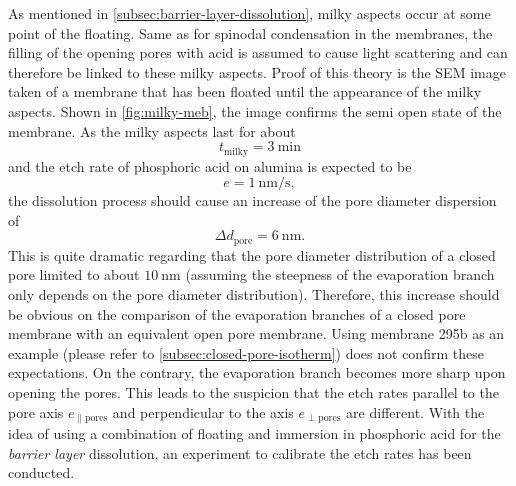 \documentclass[../thesis.tex]{subfiles}
\begin{document}
        As mentioned in \cref{subsec:barrier-layer-dissolution}, milky aspects occur at some point of the floating. Same as for spinodal condensation in the membranes, the filling of the opening pores with acid is assumed to cause light scattering and can therefore be linked to these milky aspects. Proof of this theory is the SEM image taken of a membrane that has been floated until the appearance of the milky aspects. Shown in \cref{fig:milky-meb}, the image confirms the semi open state of the membrane. As the milky aspects last for about
        \begin{equation*}
          t_\mathrm{milky} =\SI{3}{\minute}
        \end{equation*}
        and the etch rate of phosphoric acid on alumina is expected to be
        \begin{equation*}
          e=\SI{1}{\nano\meter\per\second},
        \end{equation*}
        the  dissolution process should cause an increase of the pore diameter dispersion of
        \begin{equation*}
          \Delta d_\mathrm{pore} = \SI{6}{\nano\meter}.
        \end{equation*}
        This is quite dramatic regarding that the pore diameter distribution of a closed pore limited to about $\SI{10}{\nano\meter}$ (assuming the steepness of the evaporation branch only depends on the pore diameter distribution). Therefore, this increase should be obvious on the comparison of the evaporation branches of a closed pore membrane with an equivalent open pore membrane. Using membrane 295b as an example (please refer to \cref{subsec:closed-pore-isotherm}) does not confirm these expectations. On the contrary, the evaporation branch becomes more sharp upon opening the pores. This leads to the suspicion that the etch rates parallel to the pore axis $e_\mathrm{\parallel pores}$ and perpendicular to the axis $e_\mathrm{\perp pores}$ are different. With the idea of using a combination of floating and immersion in phosphoric acid for the \textit{barrier layer} dissolution, an experiment to calibrate the etch rates has been conducted.
        \medskip
\end{document}
